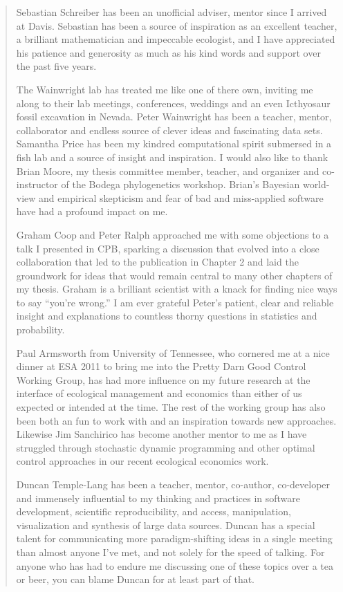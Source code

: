 \begin{quote}
Sebastian Schreiber has been an unofficial adviser, mentor since I arrived at Davis. Sebastian has been a source of inspiration as an excellent teacher, a brilliant mathematician and impeccable ecologist, and I have appreciated his patience and generosity as much as his kind words and support over the past five years.

The Wainwright lab has treated me like one of there own, inviting me along to their lab meetings, conferences, weddings and an even Icthyosaur fossil excavation in Nevada. Peter Wainwright has been a teacher, mentor, collaborator and endless source of clever ideas and fascinating data sets.  Samantha Price has been my kindred computational spirit submersed in a fish lab and a source of insight and inspiration. I would also like to thank Brian Moore, my thesis committee member, teacher, and organizer and co-instructor of the Bodega phylogenetics workshop. Brian's Bayesian world-view and empirical skepticism and fear of bad and miss-applied software have had a profound impact on me.  

Graham Coop and Peter Ralph approached me with some objections to a talk I presented in CPB, sparking a discussion that evolved into a close collaboration that led to the publication in Chapter 2 and laid the groundwork for ideas that would remain central to many other chapters of my thesis.  Graham is a brilliant scientist with a knack for finding nice ways to say ``you're wrong.''   I am ever grateful Peter's patient, clear and reliable insight and explanations to countless thorny questions in statistics and probability.  


Paul Armsworth from University of Tennessee, who cornered me at a nice dinner at ESA 2011 to bring me into the Pretty Darn Good Control Working Group, has had more influence on my future research at the interface of ecological management and economics than either of us expected or intended at the time. The rest of the working group has also been both an fun to work with and an inspiration towards new approaches.  Likewise Jim Sanchirico has become another mentor to me as I have struggled through stochastic dynamic programming and other optimal control approaches in our recent ecological economics work.  

Duncan Temple-Lang has been a teacher, mentor, co-author, co-developer and immensely influential to my thinking and practices in software development, scientific reproducibility, and access, manipulation, visualization and synthesis of large data sources. Duncan has a special talent for communicating more paradigm-shifting ideas in a single meeting than almost anyone I've met, and not solely for the speed of talking.  For anyone who has had to endure me discussing one of these topics over a tea or beer, you can blame Duncan for at least part of that.  


\end{quote}
